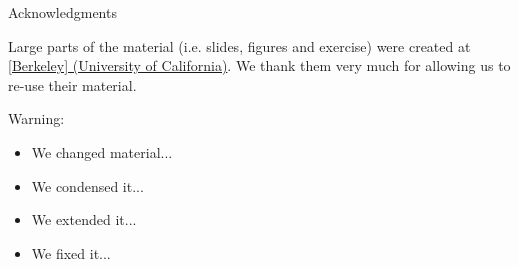 \documentclass[aspectratio=169]{../latex_main/tntbeamer}  %
\begin{document}
\begin{frame}[c]{Acknowledgments}

Large parts of the material (i.e. slides, figures and exercise) were created at \href{https://ds100.org/}{[Berkeley] (University of California)}. We thank them very much for allowing us to re-use their material.

\bigskip

\alert{Warning}:
\begin{itemize}
    \item We changed material...
    \item We condensed it...
    \item We extended it...
    \item We fixed it...
\end{itemize}


\end{frame}
\end{document}
